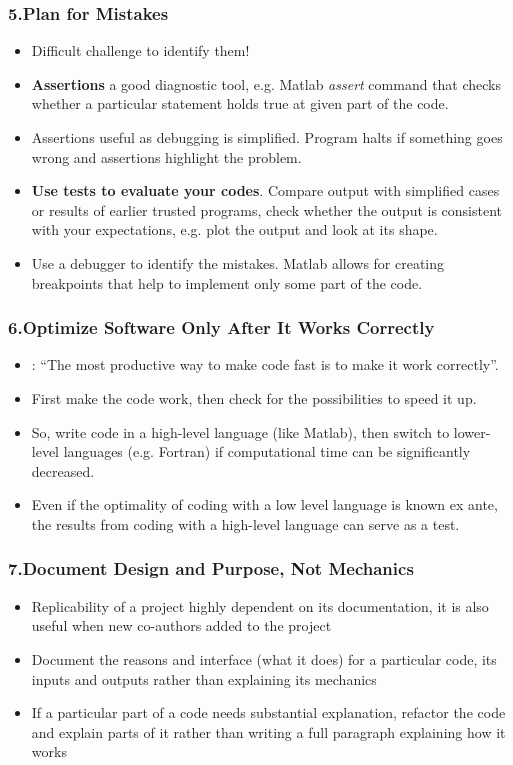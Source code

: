 \documentclass{beamer}
\newcommand{\highlight}[1]{{\color{blue}{#1}}}
\renewcommand{\highlight}[1]{{\textbf{#1}}}
\begin{document}
\begin{frame}\frametitle{5.Plan for Mistakes}
\begin{itemize}
\item Difficult challenge to identify them!
\item \highlight{Assertions} a good diagnostic tool, e.g. Matlab \textit{assert} command that checks whether a particular statement holds true at given part of the code.
\item Assertions useful as debugging is simplified. Program halts if something goes wrong and assertions highlight the problem.
\item \highlight{Use tests to evaluate your codes}. Compare output with simplified cases or results of earlier trusted programs, check whether the output is consistent with your expectations, e.g. plot the output and look at its shape.
\item Use a debugger to identify the mistakes. Matlab allows for creating breakpoints that help to implement only some part of the code.
\end{itemize}
\end{frame}
\begin{frame}
\frametitle{6.Optimize Software Only After It Works Correctly}
\begin{itemize}
\item \citet{Wilsonetal2014}: ``The most productive way to make code fast is to make it work correctly''.
\item First make the code work, then check for the possibilities to speed it up.
\item So, write code in a high-level language (like Matlab), then switch to lower-level languages (e.g. Fortran) if computational time can be significantly decreased.
\item Even if the optimality of coding with a low level language is known ex ante, the results from coding with a high-level language can serve as a test.
\end{itemize}
\end{frame}
\begin{frame}
\frametitle{7.Document Design and Purpose, Not Mechanics}
\begin{itemize}
\item Replicability of a project highly dependent on its documentation, it is also useful when new co-authors added to the project
\item Document the reasons and interface (what it does) for a particular code, its inputs and outputs rather than explaining its mechanics
\item If a particular part of a code needs substantial explanation, refactor the code and explain parts of it rather than writing a full paragraph explaining how it works
\end{itemize}
\end{frame}
\end{document}
